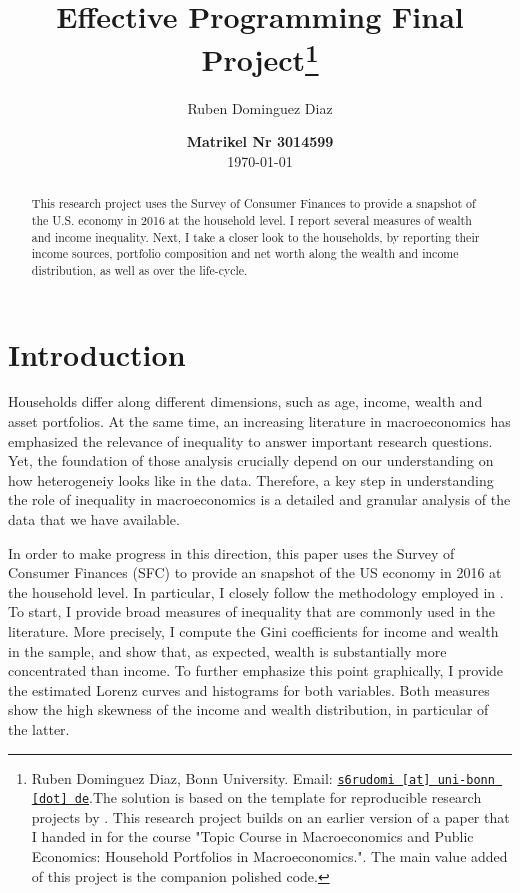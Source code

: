 \documentclass[11pt, a4paper, leqno]{article}
\begin{document}
\title{Effective Programming Final Project\thanks{Ruben Dominguez Diaz, Bonn University. Email: \href{mailto:s6rudomi@uni-bonn.de}{\nolinkurl{s6rudomi [at] uni-bonn [dot] de}}.The solution is based on the template for reproducible research projects by \citet{GaudeckerEconProjectTemplates}. This research project builds on an earlier version of a paper that I handed in for the course "Topic Course in Macroeconomics and Public Economics: Household Portfolios in Macroeconomics.". The main value added of this project is the companion polished code.} }

\author{Ruben Dominguez Diaz}

\date{
{\bf Matrikel Nr 3014599} 
\\[1ex] 
\today
}

\maketitle

\begin{abstract}
	This research project uses the Survey of Consumer Finances to provide a snapshot of the U.S. economy in 2016 at the household level. I report several measures of wealth and income inequality. Next, I take a closer look to the households, by reporting their income sources, portfolio composition and net worth along the wealth and income distribution, as well as over the life-cycle.
\end{abstract}
\clearpage

\section{Introduction} 
\label{sec:introduction}
    Households differ along different dimensions, such as age, income, wealth and asset portfolios. At the same time, an increasing literature in macroeconomics has emphasized the relevance of inequality to answer important research questions. Yet, the foundation of those analysis crucially depend on our understanding on how heterogeneiy looks like in the data. Therefore, a key step in understanding the role of inequality in macroeconomics is a detailed and granular analysis of the data that we have available.

    In order to make progress in this direction, this paper uses the Survey of Consumer Finances (SFC) to provide an snapshot of the US economy in 2016 at the household level. In particular, I closely follow the methodology employed in \citet{Kuhn2016}. To start, I provide broad measures of inequality that are commonly used in the literature. More precisely, I compute the Gini coefficients for income and wealth in the sample, and show that, as expected, wealth is substantially more concentrated than income. To further emphasize this point graphically, I provide the estimated Lorenz curves and histograms for both variables. Both measures show the high skewness of the income and wealth distribution, in particular of the latter.
\end{document}
